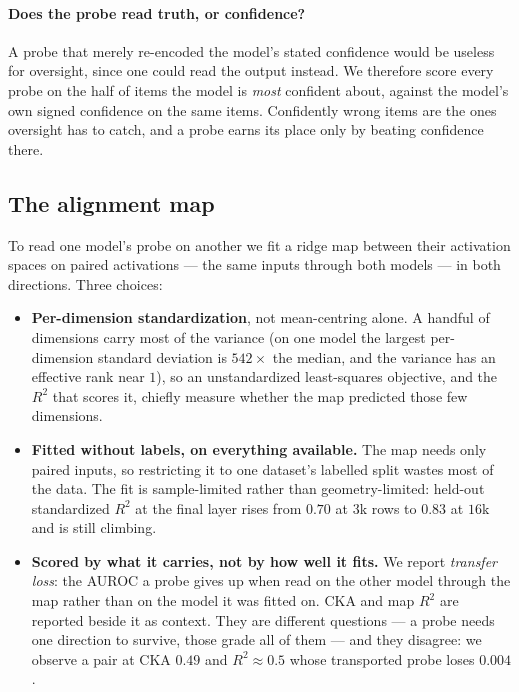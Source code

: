 \paragraph{Does the probe read truth, or confidence?}
A probe that merely re-encoded the model's stated confidence would be useless for
oversight, since one could read the output instead. We therefore score every
probe on the half of items the model is \emph{most} confident about, against the
model's own signed confidence on the same items. Confidently wrong items are the
ones oversight has to catch, and a probe earns its place only by beating
confidence there.

\subsection{The alignment map}
\label{sec:method:map}

To read one model's probe on another we fit a ridge map between their activation
spaces on paired activations --- the same inputs through both models --- in both
directions. Three choices:

\begin{itemize}
\itemsep0em
\item \textbf{Per-dimension standardization}, not mean-centring alone. A handful
  of dimensions carry most of the variance (on one model the largest
  per-dimension standard deviation is $542\times$ the median, and the variance has
  an effective rank near $1$), so an unstandardized least-squares objective, and
  the $R^2$ that scores it, chiefly measure whether the map predicted those few
  dimensions.
\item \textbf{Fitted without labels, on everything available.} The map needs only
  paired inputs, so restricting it to one dataset's labelled split wastes most of
  the data. The fit is sample-limited rather than geometry-limited: held-out
  standardized $R^2$ at the final layer rises from $0.70$ at $3$k rows to $0.83$
  at $16$k and is still climbing.
\item \textbf{Scored by what it carries, not by how well it fits.} We report
  \emph{transfer loss}: the AUROC a probe gives up when read on the other model
  through the map rather than on the model it was fitted on. CKA and map $R^2$ are
  reported beside it as context. They are different questions --- a probe needs one
  direction to survive, those grade all of them --- and they disagree: we observe a
  pair at CKA $0.49$ and $R^2 \approx 0.5$ whose transported probe loses $0.004$.
\end{itemize}

